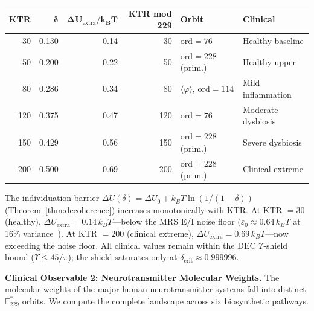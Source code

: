 \documentclass[12pt,oneside]{article}
\theoremstyle{principia}
\theoremstyle{definition}
\theoremstyle{remark}
\providecommand{\vp}{\varphi}
\begin{document}
\begin{center}
\begin{tabular}{@{}rrrrll@{}}
\toprule
\textbf{KTR} & $\boldsymbol{\delta}$ & $\boldsymbol{\Delta U_{\mathrm{extra}}/k_BT}$
  & \textbf{KTR mod 229} & \textbf{Orbit} & \textbf{Clinical} \\
\midrule
30  & 0.130 & 0.14 & 30  & $\mathrm{ord}=76$        & Healthy baseline \\
50  & 0.200 & 0.22 & 50  & $\mathrm{ord}=228$ (prim.)& Healthy upper \\
80  & 0.286 & 0.34 & 80  & $\langle\vp\rangle$, $\mathrm{ord}=114$ & Mild inflammation \\
120 & 0.375 & 0.47 & 120 & $\mathrm{ord}=76$        & Moderate dysbiosis \\
150 & 0.429 & 0.56 & 150 & $\mathrm{ord}=228$ (prim.)& Severe dysbiosis \\
200 & 0.500 & 0.69 & 200 & $\mathrm{ord}=228$ (prim.)& Clinical extreme \\
\bottomrule
\end{tabular}
\end{center}

The individuation barrier $\Delta U(\delta) = \Delta U_0 + k_BT\ln(1/(1-\delta))$
(Theorem~\ref{thm:decoherence}) increases monotonically with KTR.
At KTR $= 30$ (healthy), $\Delta U_\mathrm{extra} = 0.14\,k_BT$---below
the MRS E/I noise floor ($\varepsilon_0 \approx 0.64\,k_BT$
at 16\% variance~\cite{mrs_variance}). At KTR $= 200$ (clinical extreme),
$\Delta U_\mathrm{extra} = 0.69\,k_BT$---now exceeding the noise floor.
All clinical values remain within the DEC $\Upsilon$-shield bound
($\Upsilon \leq 45/\pi$); the shield saturates only at
$\delta_\mathrm{crit} \approx 0.999996$.

\textbf{Clinical Observable 2: Neurotransmitter Molecular Weights.}
The molecular weights of the major human neurotransmitter systems
fall into distinct $\mathbb{F}_{229}^*$ orbits. We compute the complete
landscape across six biosynthetic pathways.
\end{document}
